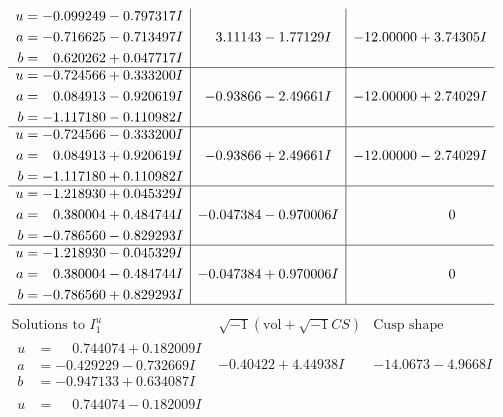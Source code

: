 \documentclass[1p]{elsarticle_modified}
\theoremstyle{definition}
\newcommand{\I}{\sqrt{-1}}
\begin{document}
$$\begin{array}{c|c|c}
\begin{aligned}
u &= -0.099249 - 0.797317 I \\
a &= -0.716625 - 0.713497 I \\
b &= \phantom{-}0.620262 + 0.047717 I\end{aligned}
 & \phantom{-}3.11143 - 1.77129 I & -12.00000 + 3.74305 I \\ \hline\begin{aligned}
u &= -0.724566 + 0.333200 I \\
a &= \phantom{-}0.084913 - 0.920619 I \\
b &= -1.117180 - 0.110982 I\end{aligned}
 & -0.93866 - 2.49661 I & -12.00000 + 2.74029 I \\ \hline\begin{aligned}
u &= -0.724566 - 0.333200 I \\
a &= \phantom{-}0.084913 + 0.920619 I \\
b &= -1.117180 + 0.110982 I\end{aligned}
 & -0.93866 + 2.49661 I & -12.00000 - 2.74029 I \\ \hline\begin{aligned}
u &= -1.218930 + 0.045329 I \\
a &= \phantom{-}0.380004 + 0.484744 I \\
b &= -0.786560 - 0.829293 I\end{aligned}
 & -0.047384 - 0.970006 I & \phantom{-0.000000 } 0 \\ \hline\begin{aligned}
u &= -1.218930 - 0.045329 I \\
a &= \phantom{-}0.380004 - 0.484744 I \\
b &= -0.786560 + 0.829293 I\end{aligned}
 & -0.047384 + 0.970006 I & \phantom{-0.000000 } 0\\
 \hline 
 \end{array}$$\newpage$$\begin{array}{c|c|c}  
\text{Solutions to }I^u_{1}& \I (\text{vol} + \sqrt{-1}CS) & \text{Cusp shape}\\
 \hline 
\begin{aligned}
u &= \phantom{-}0.744074 + 0.182009 I \\
a &= -0.429229 - 0.732669 I \\
b &= -0.947133 + 0.634087 I\end{aligned}
 & -0.40422 + 4.44938 I & -14.0673 - 4.9668 I \\ \hline\begin{aligned}
u &= \phantom{-}0.744074 - 0.182009 I \\

\end{aligned}
\end{array}$$
\end{document}
